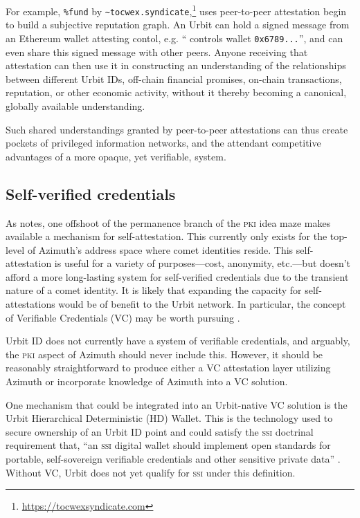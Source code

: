 \documentclass[twoside]{article}
\begin{document}
\sloppy
For example, \lstinline[style=inlinecode]{%fund} by \lstinline[style=inlinecode]{~tocwex.syndicate},\footnote{\url{https://tocwexsyndicate.com}} uses peer-to-peer attestation begin to build a subjective reputation graph. An Urbit can hold a signed message from an Ethereum wallet attesting contol, e.g. `` controls wallet \lstinline[style=inlinecode]{0x6789...}'', and can even share this signed message with other peers. Anyone receiving that attestation can then use it in constructing an understanding of the relationships between different Urbit IDs, off-chain financial promises, on-chain transactions, reputation, or other economic activity, without it thereby becoming a canonical, globally available understanding.


Such shared understandings granted by peer-to-peer attestations can thus create pockets of privileged information networks, and the attendant competitive advantages of a more opaque, yet verifiable, system.

\subsection{Self-verified credentials}

As  notes, one offshoot of the permanence branch of the \textsc{pki} idea maze makes available a mechanism for self-attestation. This currently only exists for the top-level of Azimuth's address space where comet identities reside. This self-attestation is useful for a variety of purposes—cost, anonymity, etc.—but doesn't afford a more long-lasting system for self-verified credentials due to the transient nature of a comet identity. It is likely that expanding the capacity for self-attestations would be of benefit to the Urbit network. In particular, the concept of Verifiable Credentials (VC) may be worth pursuing \citep{W3C2022a}.

Urbit ID does not currently have a system of verifiable credentials, and arguably, the \textsc{pki} aspect of Azimuth should never include this. However, it should be reasonably straightforward to produce either a VC attestation layer utilizing Azimuth or incorporate knowledge of Azimuth into a VC solution.

One mechanism that could be integrated into an Urbit-native VC solution is the Urbit Hierarchical Deterministic (HD) Wallet. This is the technology used to secure ownership of an Urbit ID point and could satisfy the \textsc{ssi} doctrinal requirement that, ``an \textsc{ssi} digital wallet should implement open standards for portable, self-sovereign verifiable credentials and other sensitive private data'' \citep{Preukschat2021}. Without VC, Urbit does not yet qualify for \textsc{ssi} under this definition.
\end{document}
